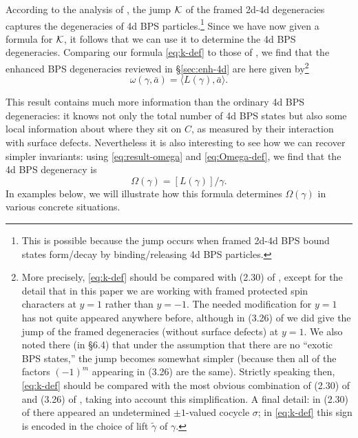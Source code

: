\documentclass[11pt,a4paper]{article}
\def\CK {{\cal K}}
\def\CK{{\cal K}}
\def\cK{{\cal K}}
\def\CK {{\cal K}}
\def\CK{{\cal K}}
\newcommand{\inprod}[1]{\langle#1\rangle}
\begin{document}
According to the analysis of \cite{Gaiotto:2010be,Gaiotto:2011tf}, the jump $\cK$ of the framed 2d-4d degeneracies
captures the degeneracies of 4d
BPS particles.\footnote{This is possible because the jump occurs when framed 2d-4d BPS bound states
form/decay by binding/releasing 4d BPS particles.}  Since we have now given a formula for $\CK$,
it follows that we can use it to determine the 4d BPS degeneracies.  Comparing our formula \eqref{eq:k-def}
to those of \cite{Gaiotto:2010be,Gaiotto:2011tf}, we find that the enhanced BPS degeneracies reviewed in \S\ref{sec:enh-4d}
are here given by\footnote{More precisely, \eqref{eq:k-def} should be
compared with (2.30) of \cite{Gaiotto:2011tf}, except for the detail that in this paper we are working
with framed protected spin characters at $y=1$ rather than $y=-1$.  The needed modification for $y=1$ has not
quite appeared anywhere before, although
in (3.26) of \cite{Gaiotto:2010be} we did give the jump of the  framed degeneracies (without surface defects) at $y=1$.
We also noted there (in \S6.4)
that under the assumption that there are no ``exotic BPS states,'' the jump becomes somewhat simpler
(because then all of the factors $(-1)^m$ appearing in (3.26) are the same).
Strictly speaking then, \eqref{eq:k-def} should be compared with the most obvious combination of (2.30) of \cite{Gaiotto:2011tf} and (3.26) of \cite{Gaiotto:2010be},
taking into account this simplification.
A final detail:  in (2.30) of \cite{Gaiotto:2011tf} there appeared an undetermined $\pm 1$-valued cocycle $\sigma$;
in \eqref{eq:k-def} this sign is encoded in the choice of lift $\tilde\gamma$ of $\gamma$.}
\begin{equation} \label{eq:result-omega}
 \omega(\gamma, \bar a) = \inprod{L(\gamma), \bar a}.
\end{equation}

This result contains much more information
than the ordinary 4d BPS degeneracies:  it knows not only the total number of 4d BPS states but
also some local information about where they sit on $C$, as measured by their interaction with
surface defects.
Nevertheless it is also interesting to see how we can
recover simpler invariants:  using \eqref{eq:result-omega} and \eqref{eq:Omega-def},
we find that the 4d BPS degeneracy is
\begin{equation} \label{eq:result-Omega}
 \Omega(\gamma) = [L(\gamma)] / \gamma.
\end{equation}
In examples below, we will illustrate how this formula determines $\Omega(\gamma)$ in various
concrete situations.
\end{document}
